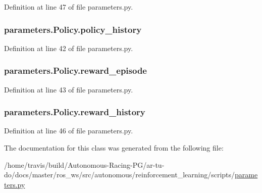 Definition at line 47 of file parameters.\+py.

\subsubsection[{\texorpdfstring{policy\+\_\+history}{policy_history}}]{\setlength{\rightskip}{0pt plus 5cm}parameters.\+Policy.\+policy\+\_\+history}\hypertarget{classparameters_1_1_policy_acd82a6d1c04d80cf93be0995da717b92}{}\label{classparameters_1_1_policy_acd82a6d1c04d80cf93be0995da717b92}


Definition at line 42 of file parameters.\+py.

\subsubsection[{\texorpdfstring{reward\+\_\+episode}{reward_episode}}]{\setlength{\rightskip}{0pt plus 5cm}parameters.\+Policy.\+reward\+\_\+episode}\hypertarget{classparameters_1_1_policy_a5af351c9adfe2c558517035310d4dee8}{}\label{classparameters_1_1_policy_a5af351c9adfe2c558517035310d4dee8}


Definition at line 43 of file parameters.\+py.

\subsubsection[{\texorpdfstring{reward\+\_\+history}{reward_history}}]{\setlength{\rightskip}{0pt plus 5cm}parameters.\+Policy.\+reward\+\_\+history}\hypertarget{classparameters_1_1_policy_a206a48d384964a49ac0c64d95b33d035}{}\label{classparameters_1_1_policy_a206a48d384964a49ac0c64d95b33d035}


Definition at line 46 of file parameters.\+py.



The documentation for this class was generated from the following file\+:\begin{DoxyCompactItemize}
\item 
/home/travis/build/\+Autonomous-\/\+Racing-\/\+P\+G/ar-\/tu-\/do/docs/master/ros\+\_\+ws/src/autonomous/reinforcement\+\_\+learning/scripts/\hyperlink{parameters_8py}{parameters.\+py}\end{DoxyCompactItemize}
